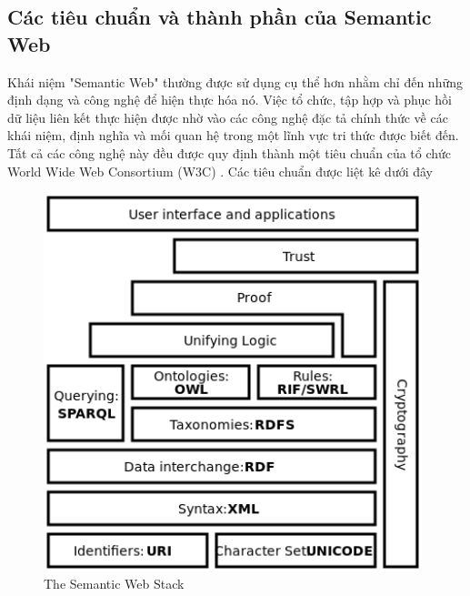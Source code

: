 \subsection{Các tiêu chuẩn và thành phần của Semantic Web}
Khái niệm "Semantic Web" thường được sử dụng cụ thể hơn nhằm chỉ đến những định dạng và công nghệ để hiện thực hóa nó. Việc tổ chức, tập hợp và phục hồi dữ liệu liên kết thực hiện được nhờ vào các công nghệ đặc tả chính thức về các khái niệm, định nghĩa và mối quan hệ trong một lĩnh vực tri thức được biết đến. Tất cả các công nghệ này đều được quy định thành một tiêu chuẩn của tổ chức World Wide Web Consortium (W3C) \cite{semantic2}. Các tiêu chuẩn được liệt kê dưới đây
\begin{figure}[h!]
	\centering
	\includegraphics[width=110mm]{Figures/semantic_web_stack.png}
	\caption{The Semantic Web Stack \label{overflow}}
\end{figure}
